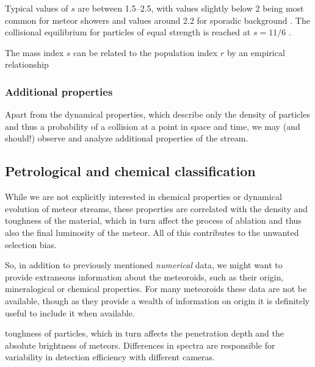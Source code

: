             Typical values of $s$ are between \numrange{1.5}{2.5}, with values slightly below 2 being most common
            for meteor showers \cite{} and values around \num{2.2} for sporadic background \cite{blaauw+2011}.
            The collisional equilibrium for particles of equal strength is reached at $s = 11/6$ \citep{dohnanyi1969}.

            The mass index $s$ can be related to the population index $r$ by an empirical relationship \citep{koschack+1990}

        \subsubsection{Additional properties} \label{mpa}
            Apart from the dynamical properties, which describe only the density of particles
            and thus a probability of a collision at a point in space and time,
            we may (and should!) observe and analyze additional properties of the stream.

            \subsection{Petrological and chemical classification} \label{mpac}
                While we are not explicitly interested in chemical properties
                or dynamical evolution of meteor streams, these properties
                are correlated with the density and toughness of the material,
                which in turn affect the process of ablation
                and thus also the final luminosity of the meteor.
                All of this contributes to the unwanted selection bias.

                So, in addition to previously mentioned \textit{numerical} data, we might want to
                provide extraneous information about the meteoroids, such as their origin,
                mineralogical or chemical properties.
                For many meteoroids these data are not be available,
                though as they provide a wealth of information on origin
                it is definitely useful to include it when available.


                toughness of particles, which in turn affects the penetration depth
                and the absolute brightness of meteors.
                Differences in spectra are responsible for variability in detection efficiency with different cameras.


